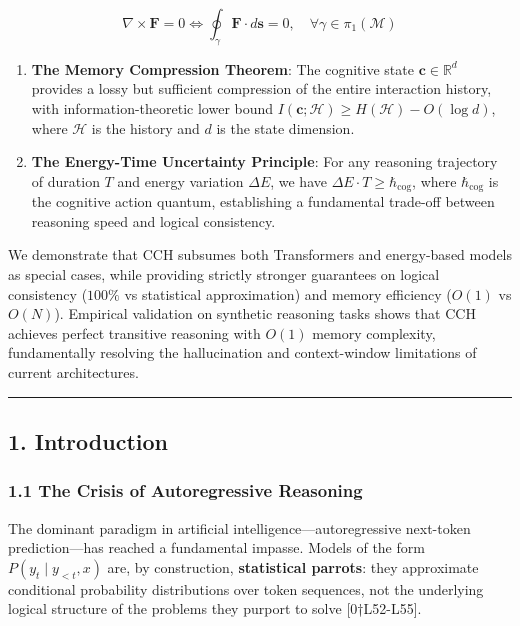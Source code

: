 \documentclass[
  11pt,
  a4paper,
]{article}
\begin{document}
\[\nabla \times \mathbf{F} = 0 \iff \oint_{\gamma} \mathbf{F} \cdot d\mathbf{s} = 0, \quad \forall \gamma \in \pi_1(\mathcal{M})\]

\begin{enumerate}
\def\labelenumi{\arabic{enumi}.}
\setcounter{enumi}{1}
\item
  \textbf{The Memory Compression Theorem}: The cognitive state
  \(\mathbf{c} \in \mathbb{R}^d\) provides a lossy but sufficient
  compression of the entire interaction history, with
  information-theoretic lower bound
  \(I(\mathbf{c}; \mathcal{H}) \geq H(\mathcal{H}) - O(\log d)\), where
  \(\mathcal{H}\) is the history and \(d\) is the state dimension.
\item
  \textbf{The Energy-Time Uncertainty Principle}: For any reasoning
  trajectory of duration \(T\) and energy variation \(\Delta E\), we
  have \(\Delta E \cdot T \geq \hbar_{\text{cog}}\), where
  \(\hbar_{\text{cog}}\) is the cognitive action quantum, establishing a
  fundamental trade-off between reasoning speed and logical consistency.
\end{enumerate}

We demonstrate that CCH subsumes both Transformers and energy-based
models as special cases, while providing strictly stronger guarantees on
logical consistency (\(100\%\) vs statistical approximation) and memory
efficiency (\(O(1)\) vs \(O(N)\)). Empirical validation on synthetic
reasoning tasks shows that CCH achieves perfect transitive reasoning
with \(O(1)\) memory complexity, fundamentally resolving the
hallucination and context-window limitations of current architectures.

\begin{center}\rule{0.5\linewidth}{0.5pt}\end{center}

\subsection{1. Introduction}\label{introduction}

\subsubsection{1.1 The Crisis of Autoregressive
Reasoning}\label{the-crisis-of-autoregressive-reasoning}

The dominant paradigm in artificial intelligence---autoregressive
next-token prediction---has reached a fundamental impasse. Models of the
form \(P(y_t \mid y_{<t}, x)\) are, by construction, \textbf{statistical
parrots}: they approximate conditional probability distributions over
token sequences, not the underlying logical structure of the problems
they purport to solve {[}0†L52-L55{]}.
\end{document}
